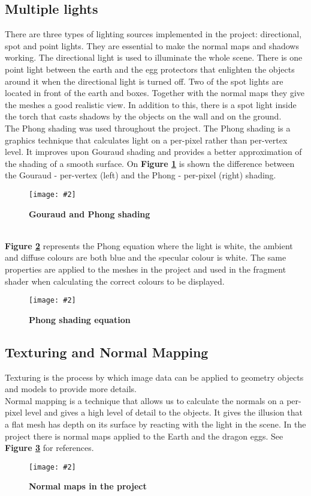 \documentclass[10pt, a4paper]{article}
\newcommand{\figuremacro}[5]{
    \begin{figure}[#1]
        \centering
        \texttt{[image: \#2]}
        \caption[#3]{\textbf{#3}#4}
        \label{fig:#2}
    \end{figure}
}
\begin{document}
	\subsection{Multiple lights}
	There are three types of lighting sources implemented in the project: directional, spot and point lights. They are essential to make the normal maps and shadows working. The directional light is used to illuminate the whole scene. There is one point light between the earth and the egg protectors that enlighten the objects around it when the directional light is turned off. Two of the spot lights are located in front of the earth and boxes. Together with the normal maps they give the meshes a good realistic view. In addition to this, there is a spot light inside the torch that casts shadows by the objects on the wall and on the ground. 
	\\The Phong shading was used throughout the project. The Phong shading is a graphics technique that calculates light on a per-pixel rather than per-vertex level. It improves upon Gouraud shading and provides a better approximation of the shading of a smooth surface. On \textbf{Figure {\ref{fig:phongAndGouraud}}} is shown the difference between the Gouraud - per-vertex (left) and the Phong - per-pixel (right) shading.
	\figuremacro{h}{phongAndGouraud}{Gouraud and Phong shading}{ }{1.0}	
	\\
	\textbf{Figure {\ref{fig:phongEquation}}} represents the Phong equation where the light is white, the ambient and diffuse colours are both blue and the specular colour is white. The same properties are applied to the meshes in the project and used in the fragment shader when calculating the correct colours to be displayed.
	\figuremacro{h}{phongEquation}{Phong shading equation}{ }{1.0}		
	
	\subsection{Texturing and Normal Mapping}
	Texturing is the process by which image data can be applied to geometry objects and models to provide more details. 
    \\Normal mapping is a technique that allows us to calculate the normals on a per-pixel level and gives a high level of detail to the objects. It gives the illusion that a flat mesh has depth on its surface by reacting with the light in the scene. In the project there is normal maps applied to the Earth and the dragon eggs. See \textbf{Figure {\ref{fig:normalMaps}}} for references.
   	\figuremacro{h}{normalMaps}{Normal maps in the project}{ }{1.0}	
   	
\end{document}

